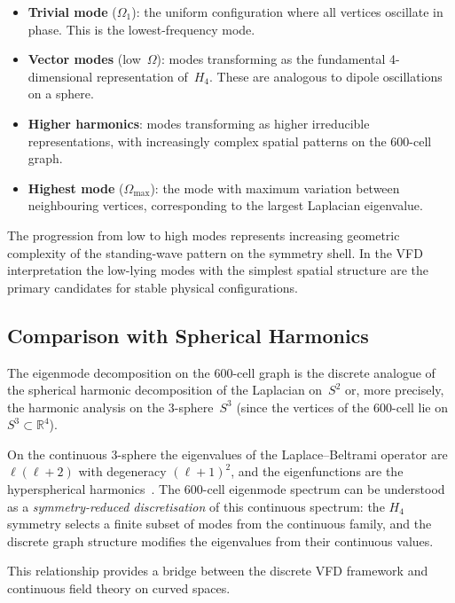 \documentclass[12pt,a4paper]{article}
\newcommand{\Hfour}{H_4}
\newcommand{\R}{\mathbb{R}}
\begin{document}
\begin{itemize}[nosep]
  \item \textbf{Trivial mode} ($\Omega_1$): the uniform configuration where
    all vertices oscillate in phase.  This is the lowest-frequency mode.
  \item \textbf{Vector modes} (low~$\Omega$): modes transforming as the
    fundamental 4-dimensional representation of~$\Hfour$.  These are analogous
    to dipole oscillations on a sphere.
  \item \textbf{Higher harmonics}: modes transforming as higher irreducible
    representations, with increasingly complex spatial patterns on the
    600-cell graph.
  \item \textbf{Highest mode} ($\Omega_{\max}$): the mode with maximum
    variation between neighbouring vertices, corresponding to the largest
    Laplacian eigenvalue.
\end{itemize}

The progression from low to high modes represents increasing geometric
complexity of the standing-wave pattern on the symmetry shell.  In the VFD
interpretation the low-lying modes with the simplest spatial structure are the
primary candidates for stable physical configurations.

\subsection{Comparison with Spherical Harmonics}

The eigenmode decomposition on the 600-cell graph is the discrete analogue of
the spherical harmonic decomposition of the Laplacian on~$S^2$ or, more
precisely, the harmonic analysis on the 3-sphere~$S^3$ (since the vertices of
the 600-cell lie on $S^3 \subset \R^4$).

On the continuous 3-sphere the eigenvalues of the Laplace--Beltrami operator
are $\ell(\ell+2)$ with degeneracy $(\ell+1)^2$, and the eigenfunctions are
the hyperspherical harmonics~\cite{vilenkin1993}.  The 600-cell eigenmode
spectrum can be understood as a \emph{symmetry-reduced discretisation} of this
continuous spectrum: the $\Hfour$ symmetry selects a finite subset of modes
from the continuous family, and the discrete graph structure modifies the
eigenvalues from their continuous values.

This relationship provides a bridge between the discrete VFD framework and
continuous field theory on curved spaces.
\end{document}
